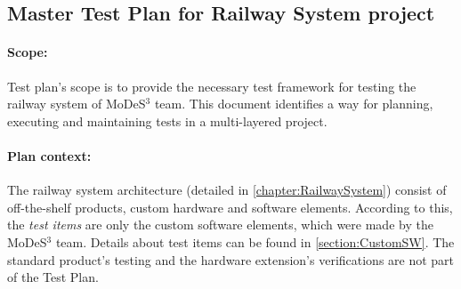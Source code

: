\subsection{Master Test Plan for Railway System project}\label{section:MTP}
\paragraph{Scope:} Test plan's scope is to provide the necessary test framework for testing the railway system of MoDeS$^3$ team. This document identifies a way for planning, executing and maintaining tests in a multi-layered project.
\paragraph{Plan context:} The railway system architecture (detailed in \autoref{chapter:RailwaySystem}) consist of off-the-shelf products, custom hardware and software elements. According to this, the \textit{test items} are only the custom software elements, which were made by the MoDeS$^3$ team. Details about test items can be found in \autoref{section:CustomSW}. The standard product's testing and the hardware extension's verifications are not part of the Test Plan.
